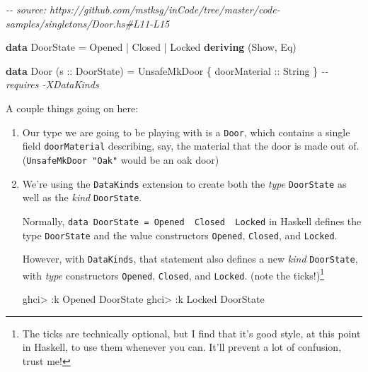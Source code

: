 \documentclass[]{article}
\newenvironment{Shaded}{}{}
\newcommand{\CommentTok}[1]{\textcolor[rgb]{0.38,0.63,0.69}{\textit{#1}}}
\newcommand{\DataTypeTok}[1]{\textcolor[rgb]{0.56,0.13,0.00}{#1}}
\newcommand{\KeywordTok}[1]{\textcolor[rgb]{0.00,0.44,0.13}{\textbf{#1}}}
\newcommand{\NormalTok}[1]{#1}
\newcommand{\OperatorTok}[1]{\textcolor[rgb]{0.40,0.40,0.40}{#1}}
\newcommand{\OtherTok}[1]{\textcolor[rgb]{0.00,0.44,0.13}{#1}}
\begin{document}
\begin{Shaded}
\begin{Highlighting}[]
\CommentTok{{-}{-} source: https://github.com/mstksg/inCode/tree/master/code{-}samples/singletons/Door.hs\#L11{-}L15}

\KeywordTok{data} \DataTypeTok{DoorState} \OtherTok{=} \DataTypeTok{Opened} \OperatorTok{|} \DataTypeTok{Closed} \OperatorTok{|} \DataTypeTok{Locked}
  \KeywordTok{deriving}\NormalTok{ (}\DataTypeTok{Show}\NormalTok{, }\DataTypeTok{Eq}\NormalTok{)}

\KeywordTok{data} \DataTypeTok{Door}\NormalTok{ (}\OtherTok{s ::} \DataTypeTok{DoorState}\NormalTok{) }\OtherTok{=} \DataTypeTok{UnsafeMkDoor}\NormalTok{ \{}\OtherTok{ doorMaterial ::} \DataTypeTok{String}\NormalTok{ \}}
                  \CommentTok{{-}{-} requires {-}XDataKinds}
\end{Highlighting}
\end{Shaded}

A couple things going on here:

\begin{enumerate}
\def\labelenumi{\arabic{enumi}.}
\item
  Our type we are going to be playing with is a \texttt{Door}, which contains a
  single field \texttt{doorMaterial} describing, say, the material that the door
  is made out of. (\texttt{UnsafeMkDoor\ "Oak"} would be an oak door)
\item
  We're using the \texttt{DataKinds} extension to create both the \emph{type}
  \texttt{DoorState} as well as the \emph{kind} \texttt{DoorState}.

  Normally,
  \texttt{data\ DoorState\ =\ Opened\ \textbar{}\ Closed\ \textbar{}\ Locked} in
  Haskell defines the type \texttt{DoorState} and the value constructors
  \texttt{Opened}, \texttt{Closed}, and \texttt{Locked}.

  However, with \texttt{DataKinds}, that statement also defines a new
  \emph{kind} \texttt{DoorState}, with \emph{type} constructors
  \texttt{\textquotesingle{}Opened}, \texttt{\textquotesingle{}Closed}, and
  \texttt{\textquotesingle{}Locked}. (note the \texttt{\textquotesingle{}}
  ticks!)\footnote{The \texttt{\textquotesingle{}} ticks are technically
    optional, but I find that it's good style, at this point in Haskell, to use
    them whenever you can. It'll prevent a lot of confusion, trust me!}

\begin{Shaded}
\begin{Highlighting}[]
\NormalTok{ghci}\OperatorTok{\textgreater{}} \OperatorTok{:}\NormalTok{k }\DataTypeTok{\textquotesingle{}Opened}
\DataTypeTok{DoorState}
\NormalTok{ghci}\OperatorTok{\textgreater{}} \OperatorTok{:}\NormalTok{k }\DataTypeTok{\textquotesingle{}Locked}
\DataTypeTok{DoorState}
\end{Highlighting}
\end{Shaded}
\end{enumerate}
\end{document}
